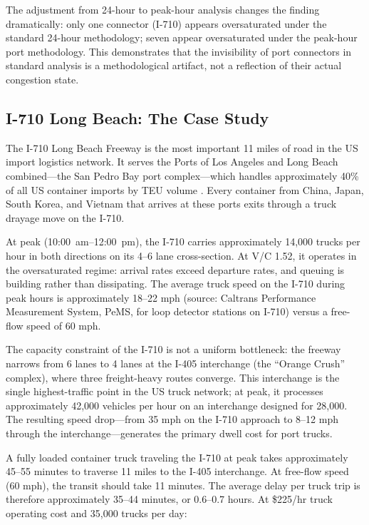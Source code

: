 The adjustment from 24-hour to peak-hour analysis changes the finding dramatically: only one connector (I-710) appears oversaturated under the standard 24-hour methodology; seven appear oversaturated under the peak-hour port methodology. This demonstrates that the invisibility of port connectors in standard analysis is a methodological artifact, not a reflection of their actual congestion state.

\subsection{I-710 Long Beach: The Case Study}

The I-710 Long Beach Freeway is the most important 11 miles of road in the US import logistics network. It serves the Ports of Los Angeles and Long Beach combined---the San Pedro Bay port complex---which handles approximately 40\% of all US container imports by TEU volume \citep{BTS_airfreight2023}. Every container from China, Japan, South Korea, and Vietnam that arrives at these ports exits through a truck drayage move on the I-710.

At peak (10:00~am--12:00~pm), the I-710 carries approximately 14,000 trucks per hour in both directions on its 4--6 lane cross-section. At V/C 1.52, it operates in the oversaturated regime: arrival rates exceed departure rates, and queuing is building rather than dissipating. The average truck speed on the I-710 during peak hours is approximately 18--22 mph (source: Caltrans Performance Measurement System, PeMS, for loop detector stations on I-710) versus a free-flow speed of 60 mph.

The capacity constraint of the I-710 is not a uniform bottleneck: the freeway narrows from 6 lanes to 4 lanes at the I-405 interchange (the ``Orange Crush'' complex), where three freight-heavy routes converge. This interchange is the single highest-traffic point in the US truck network; at peak, it processes approximately 42,000 vehicles per hour on an interchange designed for 28,000. The resulting speed drop---from 35 mph on the I-710 approach to 8--12 mph through the interchange---generates the primary dwell cost for port trucks.

A fully loaded container truck traveling the I-710 at peak takes approximately 45--55 minutes to traverse 11 miles to the I-405 interchange. At free-flow speed (60 mph), the transit should take 11 minutes. The average delay per truck trip is therefore approximately 35--44 minutes, or 0.6--0.7 hours. At \$225/hr truck operating cost \citep{ATRI_costs2024} and 35,000 trucks per day:

